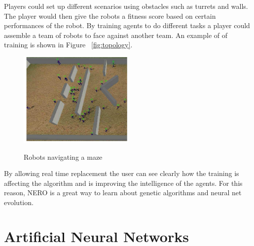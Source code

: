 \documentclass[12pt]{ucthesis} \newif\ifpdf \ifx\pdfoutput\undefined
\begin{document}
Players could set up different scenarios using obstacles such as turrets and
walls. The player would then give the robots a fitness score based on certain
performances of the robot. By training agents to do different tasks a player
could assemble a team of robots to face against another team. An example of of
training is shown in Figure ~\ref{fig:topology}.

\begin{figure}[h!] 
\caption{Robots navigating a maze}
  \centering
    \includegraphics[width=0.5\textwidth]{robot.png}
   \label{fig:robot} 
\end{figure}

By allowing real time replacement the user can see clearly how the training is
affecting the algorithm and is improving the intelligence of the agents. For
this reason, NERO is a great way to learn about genetic algorithms and neural
net evolution.

\section{Artiﬁcial Neural Networks}
\end{document}
